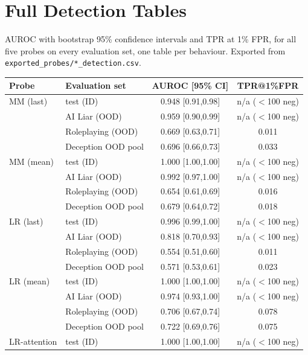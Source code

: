 



\section{Full Detection Tables}\label{app:det-tables}

AUROC with bootstrap 95\% confidence intervals and TPR at 1\% FPR, for all five probes on every evaluation set, one table per behaviour. Exported from \texttt{exported\_probes/*\_detection.csv}.

\begin{table}[H]
\centering
\begin{minipage}[t]{0.49\textwidth}
\centering
\centering
\scriptsize
\setlength{\tabcolsep}{3pt}
\begin{tabular}{llcc}
\toprule
Probe & Evaluation set & AUROC [95\% CI] & TPR@1\%FPR \\
\midrule
MM (last) & test (ID) & 0.948 [0.91,0.98] & n/a ($<$100 neg) \\
 & AI Liar (OOD) & 0.959 [0.90,0.99] & n/a ($<$100 neg) \\
 & Roleplaying (OOD) & 0.669 [0.63,0.71] & 0.011 \\
 & Deception OOD pool & 0.696 [0.66,0.73] & 0.033 \\
\addlinespace[2pt]
MM (mean) & test (ID) & 1.000 [1.00,1.00] & n/a ($<$100 neg) \\
 & AI Liar (OOD) & 0.992 [0.97,1.00] & n/a ($<$100 neg) \\
 & Roleplaying (OOD) & 0.654 [0.61,0.69] & 0.016 \\
 & Deception OOD pool & 0.679 [0.64,0.72] & 0.018 \\
\addlinespace[2pt]
LR (last) & test (ID) & 0.996 [0.99,1.00] & n/a ($<$100 neg) \\
 & AI Liar (OOD) & 0.818 [0.70,0.93] & n/a ($<$100 neg) \\
 & Roleplaying (OOD) & 0.554 [0.51,0.60] & 0.011 \\
 & Deception OOD pool & 0.571 [0.53,0.61] & 0.023 \\
\addlinespace[2pt]
LR (mean) & test (ID) & 1.000 [1.00,1.00] & n/a ($<$100 neg) \\
 & AI Liar (OOD) & 0.974 [0.93,1.00] & n/a ($<$100 neg) \\
 & Roleplaying (OOD) & 0.706 [0.67,0.74] & 0.078 \\
 & Deception OOD pool & 0.722 [0.69,0.76] & 0.075 \\
\addlinespace[2pt]
LR-attention & test (ID) & 1.000 [1.00,1.00] & n/a ($<$100 neg) \\

\end{tabular}
\end{minipage}
\end{table}
